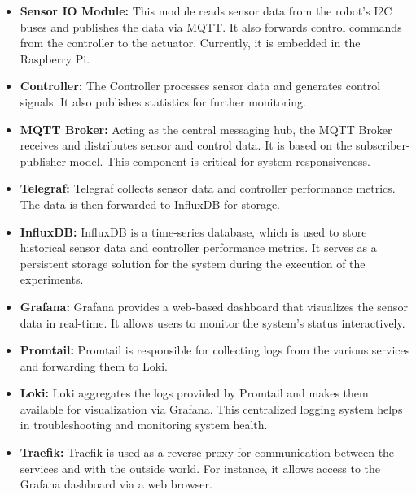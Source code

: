 \begin{itemize}
    \item \textbf{Sensor IO Module:}
    This module reads sensor data from the robot's I2C buses and publishes the data via MQTT.
    It also forwards control commands from the controller to the actuator.
    Currently, it is embedded in the Raspberry Pi.

    \item \textbf{Controller:}
    The Controller processes sensor data and generates control signals.
    It also publishes statistics for further monitoring.

    \item \textbf{MQTT Broker:}
    Acting as the central messaging hub, the MQTT Broker receives and distributes sensor and control data.
    It is based on the subscriber-publisher model.
    This component is critical for system responsiveness.

    \item \textbf{Telegraf:}
    Telegraf collects sensor data and controller performance metrics.
    The data is then forwarded to InfluxDB for storage.

    \item \textbf{InfluxDB:}
    InfluxDB is a time-series database, which is used to store historical sensor data and controller performance metrics.
    It serves as a persistent storage solution for the system during the execution of the experiments.

    \item \textbf{Grafana:}
    Grafana provides a web-based dashboard that visualizes the sensor data in real-time.
    It allows users to monitor the system's status interactively.

    \item \textbf{Promtail:}
    Promtail is responsible for collecting logs from the various services and forwarding them to Loki.

    \item \textbf{Loki:}
    Loki aggregates the logs provided by Promtail and makes them available for visualization via Grafana.
    This centralized logging system helps in troubleshooting and monitoring system health.

    \item \textbf{Traefik:}
    Traefik is used as a reverse proxy for communication between the services and with the outside world.
    For instance, it allows access to the Grafana dashboard via a web browser.
\end{itemize}


